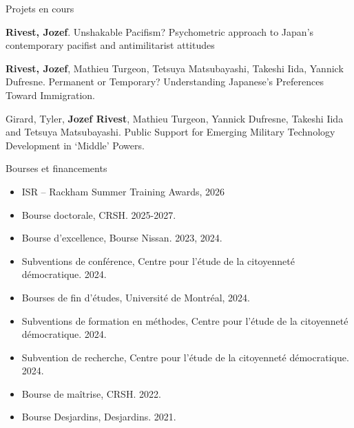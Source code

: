 \documentclass{resume} %
\begin{document}
\begin{rSection}{Projets en cours}


	{\textbf{Rivest, Jozef}. \og Unshakable Pacifism? Psychometric
		approach to Japan's contemporary pacifist and antimilitarist
		attitudes \fg{}}

	{\textbf{Rivest, Jozef}, Mathieu Turgeon, Tetsuya Matsubayashi,
		Takeshi Iida, Yannick Dufresne. \og Permanent or Temporary?
		Understanding Japanese's Preferences Toward Immigration. \fg{}}

	{Girard, Tyler, \textbf{Jozef Rivest}, Mathieu Turgeon,
		Yannick Dufresne, Takeshi Iida and Tetsuya Matsubayashi.
		\og Public Support for Emerging Military Technology
		Development in ‘Middle’ Powers. \fg{}} \par
\end{rSection}

\begin{rSection}{Bourses et financements}
	\begin{itemize}
		\item[-] ISR -- Rackham Summer Training Awards, 2026
		\item[-] Bourse doctorale, CRSH. 2025-2027.
		\item[-] Bourse d'excellence, Bourse Nissan. 2023, 2024.
		\item[-] Subventions de conférence, Centre pour l'étude de la citoyenneté démocratique. 2024.
		\item[-] Bourses de fin d'études, Université de Montréal, 2024.
		\item[-] Subventions de formation en méthodes, Centre pour l'étude de la citoyenneté démocratique. 2024.
		\item[-] Subvention de recherche, Centre pour l'étude de la citoyenneté démocratique. 2024.
		\item[-] Bourse de maîtrise, CRSH. 2022.
		\item[-] Bourse Desjardins, Desjardins. 2021.
	\end{itemize}

\end{rSection}
\end{document}
